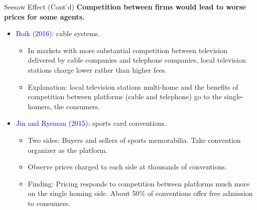 \documentclass[aspectratio=169]{beamer}  %
\begin{document}
\begin{frame}{Seesaw Effect (Cont'd)}
    \textbf{Competition between firms would lead to worse prices for some agents.}
    \vspace{0.5cm}
    \begin{itemize}
        \item \textcolor{blue}{Boik (2016)}: cable systems.
        \begin{itemize}
            \item In markets with more substantial competition between television
            delivered by cable companies and telephone companies, local television stations charge lower rather than higher fees.
            \item Explanation: local television stations multi-home and the benefits of competition between platforms (cable and telephone) go to the single-homers, the consumers.
        \end{itemize}
        \vspace{0.1cm}

        \item \textcolor{blue}{Jin and Rysman (2015)}: sports card conventions.
        \begin{itemize}
            \item Two sides: Buyers and sellers of sports memorabilia. Take convention organizer as the platform.
            \item Observe prices charged to each side at thousands of conventions.
            \item Finding: Pricing responds to competition between platforms much more on the single homing side. About 50\% of conventions offer free admission to consumers.
        \end{itemize}
    \end{itemize}

\end{frame}
\end{document}
